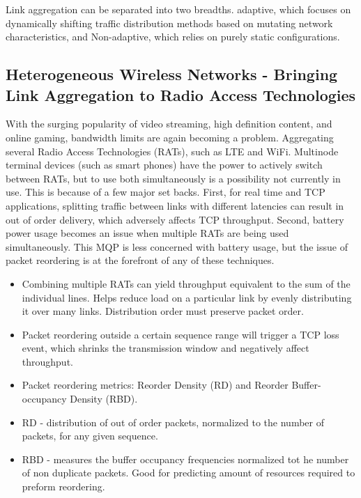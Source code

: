 \documentclass[12pt]{article}
\begin{document}
	Link aggregation can be separated into two breadths. adaptive, which focuses on dynamically shifting traffic distribution methods based on mutating network characteristics, and Non-adaptive, which relies on purely static configurations.


	\subsection{Heterogeneous Wireless Networks - Bringing Link Aggregation to Radio Access Technologies}

		With the surging popularity of video streaming, high definition content, and online gaming, bandwidth limits are again becoming a problem. Aggregating several Radio Access Technologies (RATs), such as LTE and WiFi. Multinode terminal devices (such as smart phones) have the power to actively switch between RATs, but to use both simultaneously is a possibility not currently in use. This is because of a few major set backs. First, for real time and TCP applications, splitting traffic between links with different latencies can result in out of order delivery, which adversely affects TCP throughput. Second, battery power usage becomes an issue when multiple RATs are being used simultaneously. This MQP is less concerned with battery usage, but the issue of packet reordering is at the forefront of any of these techniques. 

		\begin{itemize}

			\item Combining multiple RATs can yield throughput equivalent to the sum of the individual lines. Helps reduce load on a particular link by evenly distributing it over many links. Distribution order must preserve packet order. 

			\item Packet reordering outside a certain sequence range will trigger a TCP loss event, which shrinks the transmission window and negatively affect throughput.

			\item Packet reordering metrics: Reorder Density (RD) and Reorder Buffer-occupancy Density (RBD). 

			\item RD - distribution of out of order packets, normalized to the number of packets, for any given sequence.

			\item RBD - measures the buffer occupancy frequencies normalized tot he number of non duplicate packets. Good for predicting amount of resources required to preform reordering.

		\end{itemize}
\end{document}
